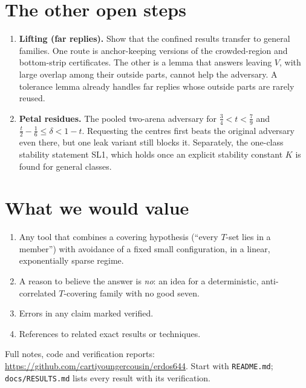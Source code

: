 \documentclass[11pt]{article}
\begin{document}
\section{The other open steps}
\begin{enumerate}
\item \textbf{Lifting (far replies).} Show that the confined results transfer to general families. One route is
anchor-keeping versions of the crowded-region and bottom-strip certificates. The other is a lemma that answers
leaving $V$, with large overlap among their outside parts, cannot help the adversary. A tolerance lemma already handles
far replies whose outside parts are rarely reused.
\item \textbf{Petal residues.} The pooled two-arena adversary for $\tfrac34<t<\tfrac79$ and
$\tfrac t2-\tfrac16\le\delta<1-t$. Requesting the centres first beats the original adversary even there, but one leak
variant still blocks it. Separately, the one-class stability statement SL1, which holds once an explicit stability
constant $K$ is found for general classes.
\end{enumerate}

\section{What we would value}
\begin{enumerate}
\item Any tool that combines a covering hypothesis (``every $T$-set lies in a member'') with avoidance of a fixed small
configuration, in a linear, exponentially sparse regime.
\item A reason to believe the answer is \emph{no}: an idea for a deterministic, anti-correlated $T$-covering family with
no good seven.
\item Errors in any claim marked verified.
\item References to related exact results or techniques.
\end{enumerate}

\medskip\noindent Full notes, code and verification reports:
\url{https://github.com/cartiyoungercousin/erdos644}. Start with \texttt{README.md}; \texttt{docs/RESULTS.md} lists
every result with its verification.
\end{document}
